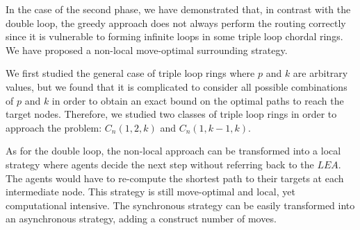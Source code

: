 In the case of the second phase, we have demonstrated that, in contrast with the double loop, the greedy approach does not always perform the routing correctly since it is vulnerable to forming infinite loops in some triple loop chordal rings. 
We have  proposed a  non-local move-optimal surrounding strategy. 


We  first  studied the general case of triple loop rings where $p$ and $k$ are arbitrary values, but we found that it is complicated to consider all possible combinations of $p$ and $k$ in order to obtain an exact bound on the optimal paths to reach the target nodes.
Therefore, we studied  two  classes of triple loop rings in order to approach the problem: $C_n(1,2,k)$ and $C_n(1,k-1,k)$.

As for the double loop, the   non-local approach can be transformed into a local strategy where agents decide the next step without referring back to the $LEA$. The agents would have to re-compute the shortest path to their targets at each intermediate node. This strategy is still move-optimal and local, yet computational intensive.  The synchronous strategy can be easily transformed into an asynchronous strategy, adding a construct number of moves. 




